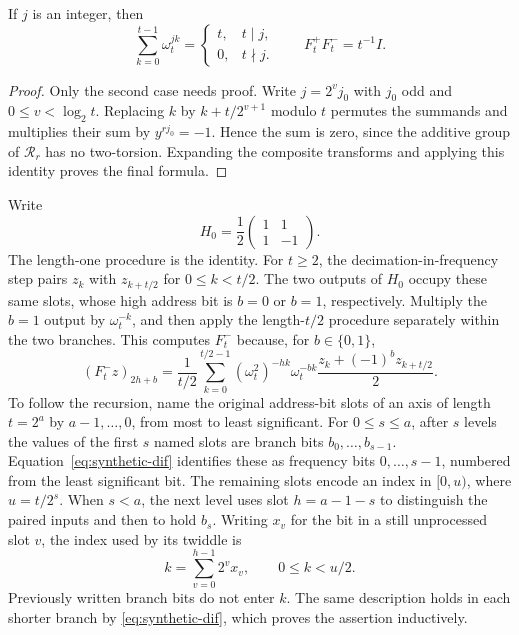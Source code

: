 \begin{lemma}
\label{lem:synthetic-characters}
If $j$ is an integer, then
\[
 \sum_{k=0}^{t-1}\omega_t^{jk}
 =\begin{cases}t,&t\mid j,\\0,&t\nmid j.\end{cases}
 \qquad F_t^+F_t^-=t^{-1}I.
\]
\end{lemma}
\begin{proof}
Only the second case needs proof.  Write $j=2^v j_0$ with $j_0$ odd
and $0\leq v<\log_2t$.  Replacing $k$ by $k+t/2^{v+1}$ modulo $t$ permutes
the summands and multiplies their sum by
$y^{rj_0}=-1$.  Hence the sum is zero, since the additive group of
$\mathcal R_r$ has no two-torsion.  Expanding the composite transforms
and applying this identity proves the final formula.
\end{proof}

Write
\[
 H_0=\frac12\begin{pmatrix}1&1\\1&-1\end{pmatrix}.
\]
The length-one procedure is the identity.  For $t\geq2$, the
decimation-in-frequency step pairs $z_k$ with $z_{k+t/2}$ for
$0\leq k<t/2$.  The two outputs of $H_0$ occupy these same slots,
whose high address bit is $b=0$ or $b=1$, respectively.  Multiply
the $b=1$ output by $\omega_t^{-k}$, and then apply the length-$t/2$
procedure separately within the two branches.  This computes
$F_t^-$ because, for $b\in\{0,1\}$,
\begin{equation}
 (F_t^-z)_{2h+b}
 =\frac1{t/2}\sum_{k=0}^{t/2-1}
       (\omega_t^2)^{-hk}\omega_t^{-bk}
       \frac{z_k+(-1)^b z_{k+t/2}}2.
 \label{eq:synthetic-dif}
\end{equation}
To follow the recursion, name the original address-bit slots of an
axis of length $t=2^a$ by $a-1,\ldots,0$, from most to least
significant.  For $0\leq s\leq a$, after $s$ levels the values of
the first $s$ named slots are branch bits $b_0,\ldots,b_{s-1}$.
Equation~\eqref{eq:synthetic-dif} identifies these as frequency bits
$0,\ldots,s-1$, numbered from the least significant bit.  The
remaining slots encode an index in $[0,u)$, where $u=t/2^s$.
When $s<a$, the next level uses slot $h=a-1-s$ to distinguish the
paired inputs and then to hold
$b_s$.  Writing $x_v$ for the bit in a still unprocessed slot $v$,
the index used by its twiddle is
\[
       k=\sum_{v=0}^{h-1}2^v x_v,\qquad 0\leq k<u/2.
\]
Previously written branch bits do not enter $k$.  The same description
holds in each shorter branch by \eqref{eq:synthetic-dif}, which proves
the assertion inductively.

